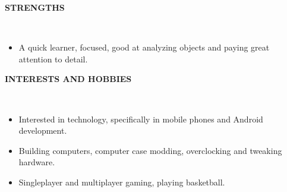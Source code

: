 \documentclass[a4paper,10pt]{article}
\newcommand{\isep}{-2 pt}
\newcommand{\lsep}{-0.5cm}
\newcommand{\resheading}[1]{{\small \colorbox{mygrey}{\begin{minipage}{0.975\textwidth}{\textbf{#1 \vphantom{p\^{E}}}}\end{minipage}}}}
\begin{document}
\resheading{\textbf{STRENGTHS} }\\[\lsep]
\begin{itemize}
\item \noindent A quick learner, focused, good at analyzing objects and paying great attention to detail.
\end{itemize}

\resheading{\textbf{INTERESTS AND HOBBIES} }\\[\lsep]
\begin{itemize}\itemsep\isep
\item \noindent Interested in technology, specifically in mobile phones and Android development.
\item \noindent Building computers, computer case modding, overclocking and tweaking hardware.
\item \noindent Singleplayer and multiplayer gaming, playing basketball.
\end{itemize}
\end{document}
